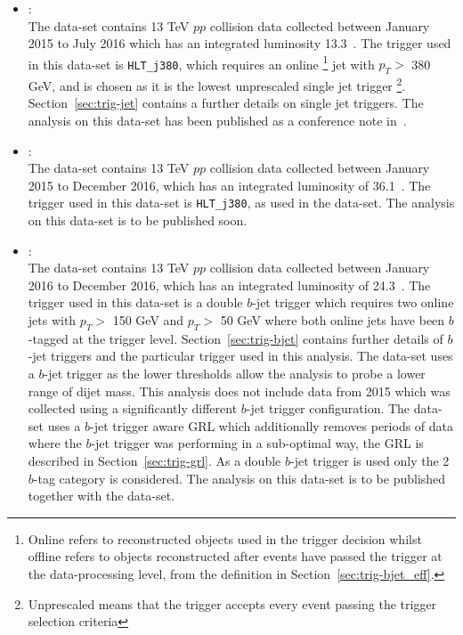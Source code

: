 \begin{itemize}[leftmargin=*]
\item\textbf{\summer{}}: \\
  The \summer{} data-set contains 13 TeV $pp$ collision data collected
  between January 2015 to July 2016 which has an integrated luminosity 13.3~\ifb.
  The trigger used in this data-set is \verb|HLT_j380|,
  which requires an online \footnote{Online refers to
    reconstructed objects used in the trigger decision
  whilst offline refers to objects reconstructed after events have passed the trigger at the data-processing level,
  from the definition in Section~\ref{sec:trig-bjet_eff}.}  jet with $p_T >$ 380 GeV, 
  and is chosen as it is the lowest unprescaled single jet trigger \footnote{Unprescaled means that the trigger accepts every event passing the trigger selection criteria}.
  Section~\ref{sec:trig-jet} contains a further details on single jet triggers.
  The analysis on this data-set has been published as a conference note in~\cite{dibjet-ichep_conf}. \\
  
\item\textbf{\hm{}}:\\
  The \hm{} data-set contains 13 TeV $pp$ collision data collected
  between January 2015 to December 2016, which has an integrated luminosity of 36.1~\ifb.
  The trigger used in this data-set is \verb|HLT_j380|, as used in the \summer{} data-set.
  The analysis on this data-set is to be published soon.\\
  
\item\textbf{\lm{}}: \\
  The \lm{} data-set contains 13 TeV $pp$ collision data collected
  between January 2016 to December 2016, which has an integrated luminosity of 24.3~\ifb.
  The trigger used in this data-set is a double $b$-jet trigger 
  which requires two online jets with $p_T >$ 150 GeV and $p_T >$ 50 GeV
  where both online jets have been $b$-tagged at the trigger level.
  Section~\ref{sec:trig-bjet} contains further details of $b$-jet triggers and the particular trigger used in this analysis.
  The \lm{} data-set uses a $b$-jet trigger as the lower \pT{} thresholds allow
  the analysis to probe a lower range of dijet mass.
  This analysis does not include data from 2015 which was collected using a significantly different $b$-jet trigger configuration.
  The \lm{} data-set uses a $b$-jet trigger aware GRL which additionally
  removes periods of data where the $b$-jet trigger was performing in a sub-optimal way,
  the GRL is described in Section~\ref{sec:trig-grl}.
  As a double $b$-jet trigger is used only the 2 $b$-tag category is considered.
  The analysis on this data-set is to be published together with the \hm{} data-set.

\end{itemize}

